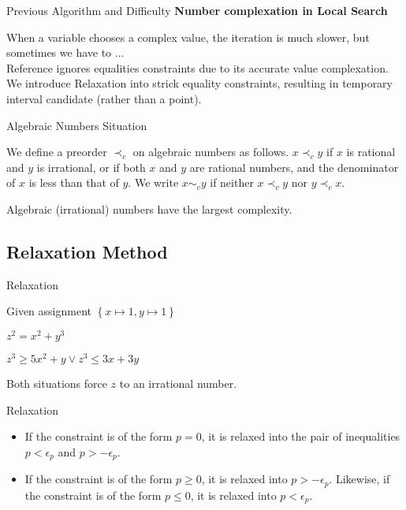 \begin{frame}{Previous Algorithm and Difficulty}
    \textbf{Number complexation in Local Search}


    When a variable chooses a complex value, the iteration is much slower, but sometimes we have to ...\\
    Reference  ignores equalities constraints due to its accurate value complexation.\\
    We introduce Relaxation into strick equality constraints, resulting in temporary interval candidate (rather than a point). \\
\end{frame}

\begin{frame}{Algebraic Numbers Situation}
    \begin{definition}
        We define a preorder $\prec_c$ on algebraic numbers as follows. $x\prec_c y$ if $x$ is rational and $y$ is irrational, or if both $x$ and $y$ are rational numbers, and the denominator of $x$ is less than that of $y$. We write $x \sim_c y$ if neither $x\prec_c y$ nor $y\prec_c x$.
        \end{definition}

    Algebraic (irrational) numbers have the largest complexity.
\end{frame}
\subsection{Relaxation Method}
\begin{frame}{Relaxation}
    \begin{Example}
        Given assignment $\left\{x\mapsto 1, y\mapsto 1\right\}$
        \begin{minipage}{0.45\textwidth}
            \centering
            $z^2 = x^2 + y^3$
        \end{minipage}
        \begin{minipage}{0.45\textwidth}
            \centering
            $z^3 \ge 5 x^2 + y \vee z^3 \le 3x + 3y$
        \end{minipage}
        \end{Example}
        \vspace{0.6cm}
        Both situations force $z$ to an irrational number.

    \begin{alertblock}{Relaxation}
    \begin{itemize}
        \item If the constraint is of the form $p=0$, it is relaxed into the pair of inequalities $p<\epsilon_p$ and $p>-\epsilon_p$.

        \item If the constraint is of the form $p\ge 0$, it is relaxed into $p>-\epsilon_p$. Likewise, if the constraint is of the form $p\le 0$, it is relaxed into $p<\epsilon_p$.
    \end{itemize}
    \end{alertblock}
\end{frame}

